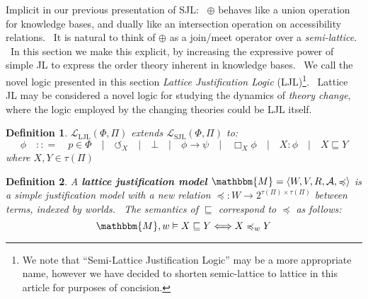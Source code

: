 \documentclass{acmconf}
\newcommand{\tmem}[1]{{\em #1\/}}
\newcommand{\tmop}[1]{\ensuremath{\operatorname{#1}}}
\newcommand{\tmstrong}[1]{\textbf{#1}}
\newcommand{\tmtextit}[1]{{\itshape{#1}}}
\newtheorem{definition}{Definition}
\begin{document}
Implicit in our previous presentation of SJL: \ $\oplus$ behaves like a union
operation for knowledge bases, and dually like an intersection operation on
accessibility relations. \ It is natural to think of $\oplus$ as a join/meet
operator over a {\tmem{semi-lattice}}. \ In this section we make this
explicit, by increasing the expressive power of simple JL to express the order
theory inherent in knowledge bases. \ We call the novel logic presented in
this section \tmtextit{Lattice Justification Logic} (LJL){\footnote{We note
that ``Semi-Lattice Justification Logic'' may be a more appropriate name,
however we have decided to shorten semic-lattice to lattice in this article
for purposes of concision.}}. \ Lattice JL may be considered a novel logic for
studying the dynamics of \tmtextit{theory change}, where the logic employed by
the changing theories could be LJL itself.



\begin{definition}
  $\mathcal{L}_{\tmop{LJL}} (\Phi, \Pi)$ extends $\mathcal{L}_{\tmop{SJL}}
  (\Phi, \Pi)$ to:
  \[ \phi \hspace{1em} : : = \hspace{1em} p \in \Phi \hspace{1em} |
     \hspace{1em} \circlearrowleft_X \hspace{1em} | \hspace{1em} \bot
     \hspace{1em} | \hspace{1em} \phi \rightarrow \psi \hspace{1em} |
     \hspace{1em} \Box_X \phi \hspace{1em} | \hspace{1em} X : \phi
     \hspace{1em} | \hspace{1em} X \sqsubseteq Y \]
  where $X, Y \in \tau (\Pi)$
\end{definition}

\begin{definition}
  \label{justmodels}A {\tmstrong{lattice justification model}} $\mathbbm{M}=
  \langle W, V, R, \mathcal{A}, \preccurlyeq \rangle$ is a simple
  justification model with a new relation $\preccurlyeq : W \rightarrow
  2^{\tau (\Pi) \times \tau (\Pi)}$ between terms, indexed by worlds. \ The
  semantics of $\sqsubseteq$ correspond to $\preccurlyeq$ as follows:
  \[ \mathbbm{M}, w \vDash X \sqsubseteq Y \Longleftrightarrow X
     \preccurlyeq_w Y \]
\end{definition}
\end{document}
